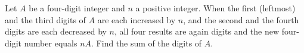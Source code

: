 Let $A$ be a four-digit integer and $n$ a positive integer. When the first (leftmost) and the third digits of $A$ are each increased by $n$, and the second and the fourth digits are each decreased by $n$, all four results are again digits and the new four-digit number equals $nA$. Find the sum of the digits of $A$.
